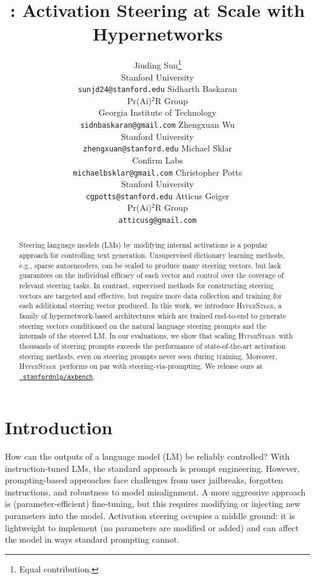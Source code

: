 \documentclass[11pt]{article}
\title{\methodname: Activation Steering at Scale with Hypernetworks}
\author{
  Jiuding Sun\thanks{Equal contribution.} \\
  Stanford University \\
  \texttt{sunjd24@stanford.edu}
  \And
  Sidharth Baskaran\footnotemark[1] \\
  Pr(Ai)$^2$R Group \\
  Georgia Institute of Technology \\
  \texttt{sidnbaskaran@gmail.com}
  \And
  Zhengxuan Wu \\
  Stanford University \\
  \texttt{zhengxuan@stanford.edu}
  \AND
  Michael Sklar \\
  Confirm Labs \\
  \texttt{michaelbsklar@gmail.com}
  \And
  Christopher Potts \\
  Stanford University \\
  \texttt{cgpotts@stanford.edu}
  \And
  Atticus Geiger \\
  Pr(Ai)$^2$R Group \\
  \texttt{atticusg@gmail.com}
}
\newcommand{\methodname}{\textsc{HyperSteer}}
\begin{document}
\maketitle
\begin{abstract}
Steering language models (LMs) by modifying internal activations is a popular approach for controlling text generation. 
Unsupervised dictionary learning methods, e.g., sparse autoencoders, can be scaled to produce many steering vectors, but lack guarantees on the individual efficacy of each vector and control over the coverage of relevant steering tasks.
In contrast, supervised methods for constructing steering vectors are targeted and effective, but require more data collection and training for each additional steering vector produced.
In this work, we introduce \methodname, a family of hypernetwork-based architectures which are trained end-to-end to generate steering vectors conditioned on the natural language steering prompts and the internals of the steered LM. 
In our evaluations, we show that scaling \methodname\ with thousands of steering prompts exceeds the performance of state-of-the-art activation steering methods, even on steering prompts never seen during training. Moreover, \methodname\ performs on par with steering-via-prompting. We release ours at \href{https://github.com/stanfordnlp/axbench}{\faGithub\ \texttt{stanfordnlp/axbench}}.
\end{abstract}

\section{Introduction}

How can the outputs of a language model (LM) be reliably controlled? With instruction-tuned LMs, the standard approach is prompt engineering. 
However, prompting-based approaches face challenges from user jailbreaks, forgotten instructions, and robustness to model misalignment. 
A more aggressive approach is (parameter-efficient) fine-tuning, but this requires modifying or injecting new parameters into the model. 
Activation steering \cite{Giulianelli:2018} occupies a middle ground: it is lightweight to implement (no parameters are modified or added) and can affect the model in ways standard prompting cannot.
\end{document}
